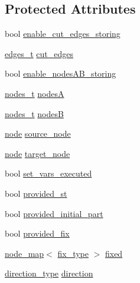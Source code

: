 \subsection*{Protected Attributes}
\begin{DoxyCompactItemize}
\item 
bool \mbox{\hyperlink{classratio__cut__partition_a7f2ddebc25563a35cb6424f7a5d4b549}{enable\+\_\+cut\+\_\+edges\+\_\+storing}}
\item 
\mbox{\hyperlink{edge_8h_a8f9587479bda6cf612c103494b3858e3}{edges\+\_\+t}} \mbox{\hyperlink{classratio__cut__partition_a5ab55eef04a72c0be731d848cb9a5d50}{cut\+\_\+edges}}
\item 
bool \mbox{\hyperlink{classratio__cut__partition_a6dff7e2e6cecdc63147fdee71d876a34}{enable\+\_\+nodes\+A\+B\+\_\+storing}}
\item 
\mbox{\hyperlink{edge_8h_a22ac17689106ba21a84e7bc54d1199d6}{nodes\+\_\+t}} \mbox{\hyperlink{classratio__cut__partition_a871cc6bf77000205fec8ab6d3a28fc28}{nodesA}}
\item 
\mbox{\hyperlink{edge_8h_a22ac17689106ba21a84e7bc54d1199d6}{nodes\+\_\+t}} \mbox{\hyperlink{classratio__cut__partition_af207198b35e52e4055487f8ae8c23d8d}{nodesB}}
\item 
\mbox{\hyperlink{classnode}{node}} \mbox{\hyperlink{classratio__cut__partition_abb18c3acafc590e258453d7a8d86bb49}{source\+\_\+node}}
\item 
\mbox{\hyperlink{classnode}{node}} \mbox{\hyperlink{classratio__cut__partition_a343ba76869e64141fb795010e388744b}{target\+\_\+node}}
\item 
bool \mbox{\hyperlink{classratio__cut__partition_aa722d032cb59664894c6301ceee86729}{set\+\_\+vars\+\_\+executed}}
\item 
bool \mbox{\hyperlink{classratio__cut__partition_a248512624766f0b21d154b4841c95a1d}{provided\+\_\+st}}
\item 
bool \mbox{\hyperlink{classratio__cut__partition_a963258b950f7142e3cac714353b1b21e}{provided\+\_\+initial\+\_\+part}}
\item 
bool \mbox{\hyperlink{classratio__cut__partition_a5f1f85feae589f7d39da48a412c90376}{provided\+\_\+fix}}
\item 
\mbox{\hyperlink{classnode__map}{node\+\_\+map}}$<$ \mbox{\hyperlink{classratio__cut__partition_a558dda40abda8ab03edb4605dbb81e36}{fix\+\_\+type}} $>$ \mbox{\hyperlink{classratio__cut__partition_ad77023b9f60e88274bf54f2019404768}{fixed}}
\item 
\mbox{\hyperlink{classratio__cut__partition_a8e2de20fc9f5cbe941aefa1c21c9b5ca}{direction\+\_\+type}} \mbox{\hyperlink{classratio__cut__partition_a11141cdf8705dbb4331315591a3759d6}{direction}}

\end{DoxyCompactItemize}
